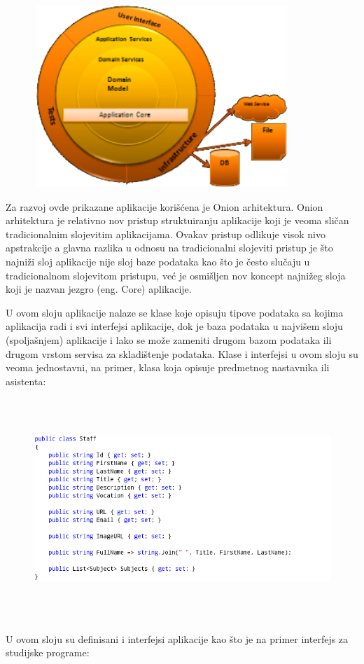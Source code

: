 \documentclass[a4paper]{article}
\begin{document}
\begin{figure}
\centering
\includegraphics[width=96.84mm,height=68.53mm]{msc-img31.png}
\end{figure}
Za razvoj ovde prikazane aplikacije korišćena je Onion arhitektura.
Onion arhitektura je relativno nov pristup struktuiranju aplikacije
koji je veoma sličan tradicionalnim slojevitim aplikacijama. Ovakav
pristup odlikuje visok nivo apstrakcije a glavna razlika u odnosu na
tradicionalni slojeviti pristup je što najniži sloj aplikacije nije
sloj baze podataka kao što je često slučaju u tradicionalnom slojevitom
pristupu, već je osmišljen nov koncept najnižeg sloja koji je nazvan
jezgro (eng. Core) aplikacije. 

U ovom sloju aplikacije nalaze se klase koje opisuju tipove podataka sa
kojima aplikacija radi i svi interfejsi aplikacije, dok je baza
podataka u najvišem sloju (spoljašnjem) aplikacije i lako se može
zameniti drugom bazom podataka ili drugom vrstom servisa za
skladištenje podataka. Klase i interfejsi u ovom sloju su veoma
jednostavni, na primer, klasa koja opisuje predmetnog nastavnika ili
asistenta:



\begin{figure}
\centering
\includegraphics[width=170mm,height=83.52mm]{msc-img32.png}
\end{figure}
U ovom sloju su definisani i interfejsi aplikacije kao što je na primer
interfejs za studijske programe:
\end{document}
